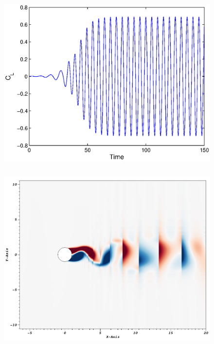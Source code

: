 \begin{frame}[allowframebreaks]
\begin{columns}[t]
				\column[]{6.5cm}
				\vspace{-1cm}
			\begin{figure}[htp]
				\centering		
				\includegraphics[width=\textwidth]{img/re200dg3cpd60cl.eps}
			\end{figure}
			\end{columns}
			\vspace{5cm}
			\begin{columns}[t]
				\column[]{6cm}
				\vspace{-1cm}
				\begin{figure}[htp]
					\centering		
					\includegraphics[width=\textwidth]{img/re100dg3cpd60.png}

\end{figure}
\end{columns}
\end{frame}
